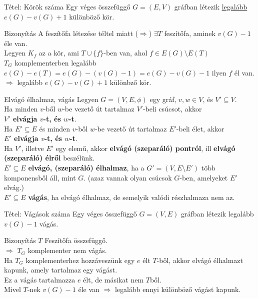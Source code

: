 \documentclass{beamer}
\begin{document}
\begin{frame} 
\begin{block}{Tétel: Körök száma}
Egy véges összefüggő $G = (E, V)$ gráfban létezik \underline{legalább} $e(G) - v(G) + 1$ különböző kör.
\end{block}

\begin{block}{Bizonyítás}
A feszítőfa létezése téltel miatt ($\Rightarrow$) $\exists T$ feszítőfa, aminek $v(G) - 1$ éle van.\\
Legyen $K_f$ az a kör, ami $T \cup \{f\}$-ben van, ahol $f \in E(G) \setminus E(T)$\\
$T_G$ komplementerben legalább $e(G) - e(T) = e(G) - (v(G) - 1) = e(G) - v(G) - 1$ ilyen $f$ él van.\\
$\Rightarrow$ legalább $e(G) - v(G) + 1$ különbző kör.
\end{block}
\end{frame}

\begin{frame}
\begin{block}{Elvágó élhalmaz, vágás}
Legyen $G =  (V, E, {\phi})$ egy gráf, $v, w \in V$, és $V' \subseteq V$.\\
\bigskip
Ha minden $v$-ből $w$-be vezető út tartalmaz $V'$-beli csúcsot, akkor\\
\medskip
\textbf{$V'$ elvágja $v$-t, és $w$-t}.\\
\medskip
Ha $E' \subseteq E$ és minden $v$-ből $w$-be vezető út tartalmaz $E'$-beli élet, akkor\\
\medskip
\textbf{$E'$ elvágja $v$-t, és $w$-t}.\\
\bigskip
Ha $V'$, illetve $E'$ egy elemű, akkor \textbf{elvágó (szeparáló) pontról}, ill \textbf{elvágó (szeparáló) élről} beszélünk.\\
\bigskip
$E' \subseteq E$ \textbf{elvágó, (szeparáló) élhalmaz}, ha a $G' = (V, E \setminus E')$ több komponensből áll, mint $G$. (azaz vannak olyan csúcsok $G$-ben, amelyeket $E'$ elvág.)\\
\bigskip
$E' \subseteq E$ \textbf{vágás}, ha elvágó élhalmaz, de semelyik  valódi részhalmaza nem az.
\end{block}
\end{frame}

\begin{frame}
\begin{block}{Tétel: Vágások száma}
Egy véges összefüggő $G = (V, E)$ gráfban létezik legalább $v(G) - 1$ vágás.
\end{block}

\begin{block}{Bizonyítás}
$T$ Feszítőfa összefüggő.\\
$\Rightarrow$ $T_G$ komplementer nem vágás.\\
Ha $T_G$ komplementerhez hozzáveszünk egy $e$ élt $T$-ből, akkor elvágó élhalmazt kapunk, amely tartalmaz egy vágást.\\
Ez a vágás tartalmazza $e$ élt, de másikat nem $T$ből.\\
Mivel $T$-nek $v(G) - 1$ éle van $\Rightarrow$ legalább ennyi különböző vágást kapunk.
\end{block}
\end{frame}
\end{document}
